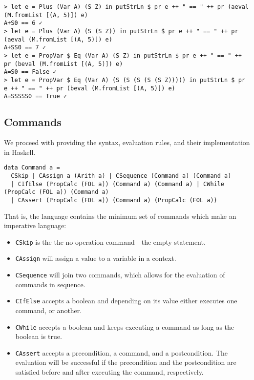 \documentclass{article}
\begin{document}
\begin{lstlisting}
> let e = Plus (Var A) (S Z) in putStrLn $ pr e ++ " == " ++ pr (aeval (M.fromList [(A, 5)]) e)
A+S0 == 6 ✓
> let e = Plus (Var A) (S (S Z)) in putStrLn $ pr e ++ " == " ++ pr (aeval (M.fromList [(A, 5)]) e)
A+SS0 == 7 ✓
> let e = PropVar $ Eq (Var A) (S Z) in putStrLn $ pr e ++ " == " ++ pr (beval (M.fromList [(A, 5)]) e)
A=S0 == False ✓
> let e = PropVar $ Eq (Var A) (S (S (S (S (S Z))))) in putStrLn $ pr e ++ " == " ++ pr (beval (M.fromList [(A, 5)]) e)
A=SSSSS0 == True ✓
\end{lstlisting}

\subsection{Commands}

We proceed with providing the syntax, evaluation rules, and their implementation in Haskell.

\begin{lstlisting}
data Command a =
  CSkip | CAssign a (Arith a) | CSequence (Command a) (Command a)
  | CIfElse (PropCalc (FOL a)) (Command a) (Command a) | CWhile (PropCalc (FOL a)) (Command a)
  | CAssert (PropCalc (FOL a)) (Command a) (PropCalc (FOL a))
\end{lstlisting}

That is, the language contains the minimum set of commands which make an imperative language:

\begin{itemize}
\item \texttt{CSkip} is the the no operation command - the empty statement.
\item \texttt{CAssign} will assign a value to a variable in a context.
\item \texttt{CSequence} will join two commands, which allows for the evaluation of commands in sequence.
\item \texttt{CIfElse} accepts a boolean and depending on its value either executes one command, or another.
\item \texttt{CWhile} accepts a boolean and keeps executing a command as long as the boolean is true.
\item \texttt{CAssert} accepts a precondition, a command, and a postcondition. The evaluation will be successful if the precondition and the postcondition are satisfied before and after executing the command, respectively.
\end{itemize}
\end{document}
